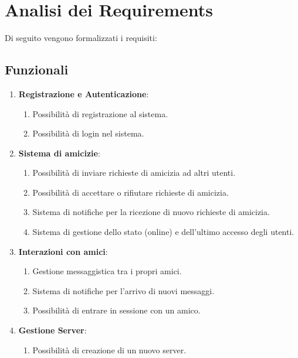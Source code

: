 \section{Analisi dei Requirements}

Di seguito vengono formalizzati i requisiti:

\subsection{Funzionali}

\begin{enumerate}
    \item \textbf{Registrazione e Autenticazione}:
    \begin{enumerate}[label*=\arabic*.]
        \item Possibilità di registrazione al sistema.
        
        \item Possibilità di login nel sistema.
    \end{enumerate}
    \item \textbf{Sistema di amicizie}:
    \begin{enumerate}[label*=\arabic*.]
        \item Possibilità di inviare richieste di amicizia ad altri utenti.
        
        \item Possibilità di accettare o rifiutare richieste di amicizia.
        
        \item Sistema di notifiche per la ricezione di nuovo richieste di amicizia.
        
        \item Sistema di gestione dello stato (online) e dell'ultimo accesso degli utenti.
    \end{enumerate}
    \item \textbf{Interazioni con amici}:
    \begin{enumerate}[label*=\arabic*.]
        \item Gestione messaggistica tra i propri amici.
        
        \item Sistema di notifiche per l'arrivo di nuovi messaggi.

        \item Possibilità di entrare in sessione con un amico.
    \end{enumerate}
    \item \textbf{Gestione Server}:
    \begin{enumerate}[label*=\arabic*.]
        \item Possibilità di creazione di un nuovo server.
        

\end{enumerate}
\end{enumerate}
